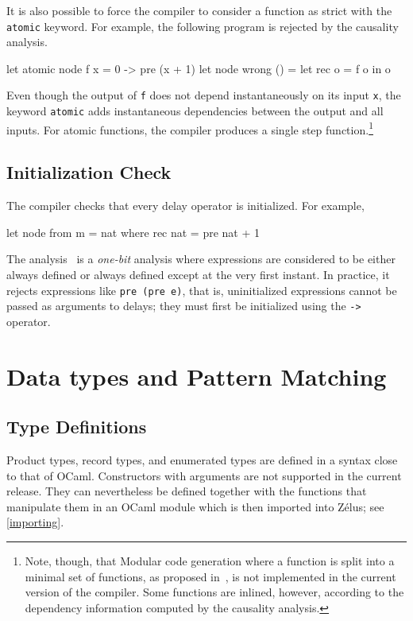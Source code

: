 \documentclass[11pt,titlepage,twoside]{report}
\makeatletter
\newcommand{\zls}[1]{{\@span{class="zelusinline"}#1}}
\newcommand{\zls}[1]{\texttt{#1}}
\renewcommand{\zls}[1]{\texttt{#1}}
\newcommand{\zelus}{{\sf Z\'elus}}
\newcommand{\ocaml}{{\sf OCaml}}
\makeatother
\begin{document}
It is also possible to force the compiler to consider a function as strict 
with the \zls{atomic} keyword. For example, the following program is
rejected by the causality analysis.
%
\begin{chklisting}
let atomic node f x = 0 -> pre (x + 1)
let node wrong () =
  let rec o = f o in o
\end{chklisting}
%
Even though the output of \zls{f} does not depend instantaneously
on its input \zls{x}, the keyword \zls{atomic} adds instantaneous 
dependencies between the output and all inputs.
For atomic functions, the compiler produces a single step
function.\footnote{Note, though, that Modular code generation
  where a function is split into a minimal set of functions, as
  proposed in~\cite{lucy:emsoft09,lustre:tripakis-popl09}, is not
  implemented in the current version of the compiler. Some functions
  are inlined, however, according to the dependency information
  computed by the causality analysis.}

\subsection{Initialization Check\label{initcheck}} %

The compiler checks that every delay operator is initialized. For
example,
\begin{chklisting}
let node from m = nat where
  rec nat = pre nat + 1
\end{chklisting}
The analysis~\cite{lucy:sttt04} is a {\em one-bit} analysis where 
expressions are considered to be either always defined or always defined 
except at the very first instant.
In practice, it rejects expressions like \zls{pre (pre e)}, that is,
uninitialized expressions cannot be passed as arguments to delays; they must 
first be initialized using the \zls{->} operator.

\section{Data types and Pattern Matching\label{dtypespatterns}} %
\subsection{Type Definitions\label{typedef}} %

Product types, record types, and enumerated types are defined in a syntax 
close to that of \ocaml.
Constructors with arguments are not supported in the current release.
They can nevertheless be defined together with the functions that manipulate 
them in an \ocaml{} module which is then imported into \zelus; see 
\cref{importing}.
\end{document}
